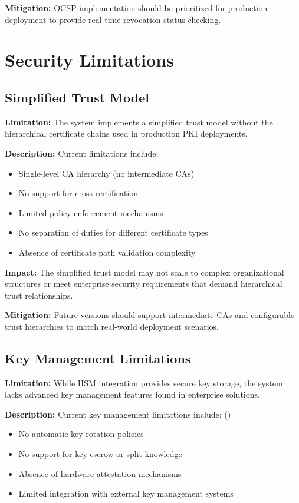 \textbf{Mitigation:} OCSP implementation should be prioritized for production deployment to provide real-time revocation status checking.

\section{Security Limitations}

\subsection{Simplified Trust Model}

\textbf{Limitation:} The system implements a simplified trust model without the hierarchical certificate chains used in production PKI deployments.

\textbf{Description:} Current limitations include:
\begin{itemize}
    \item Single-level CA hierarchy (no intermediate CAs)
    \item No support for cross-certification
    \item Limited policy enforcement mechanisms
    \item No separation of duties for different certificate types
    \item Absence of certificate path validation complexity
\end{itemize}

\textbf{Impact:} The simplified trust model may not scale to complex organizational structures or meet enterprise security requirements that demand hierarchical trust relationships.

\textbf{Mitigation:} Future versions should support intermediate CAs and configurable trust hierarchies to match real-world deployment scenarios.

\subsection{Key Management Limitations}

\textbf{Limitation:} While HSM integration provides secure key storage, the system lacks advanced key management features found in enterprise solutions.

\textbf{Description:} Current key management limitations include: ({\color{red}{TODO: Check}})
\begin{itemize}
    \item No automatic key rotation policies 
    \item No support for key escrow or split knowledge
    \item Absence of hardware attestation mechanisms
    \item Limited integration with external key management systems
\end{itemize}

